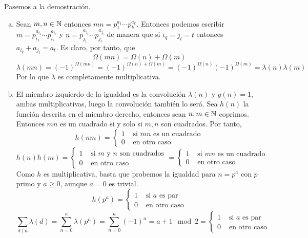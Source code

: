 \documentclass[twoside]{article}
\begin{document}
\begin{solucion}
Pasemos a la demostración.
\begin{enumerate}[(a)]
\item Sean $m,n\in \mathbb{N}$ entonces $mn = p_1^{a_1}\cdots p_k^{a_k}$. Entonces podemos escribir $m=p_{i_1}^{a_{i_1}}\cdots p_{i_s}^{a_{i_s}}$ y $n=p_{j_1}^{a_{j_1}}\cdots p_{j_t}^{a_{j_t}}$ de manera que si $i_q=j_l = t$ entonces $a_{i_q}+a_{j_l}=a_t$. Es claro, por tanto, que 
$$ \Omega(mn) = \Omega(n)+\Omega(m) $$ $$ \lambda(mn) = (-1)^{\Omega(mn)}=(-1)^{ \Omega(n)+\Omega(m)} = (-1)^{\Omega(n)}(-1)^{\Omega(m)} = \lambda(n)\lambda(m)
$$
Por lo que $\lambda$ es completamente multiplicativa.
\item  El miembro izquierdo de la igualdad es la convolución $\lambda(n)$ y $g(n)=1$, ambas multiplicativas, luego la convolución también lo será. Sea $h(n)$ la función descrita en el miembro derecho, entonces sean $n,m\in \mathbb{N}$ coprimos. Entonces $mn$ es un cuadrado si y solo si $m,n$ son cuadrados. Por tanto,
 $$
 h(nm)=\begin{cases}
 		1 &\text{ si }mn\text{ es un cuadrado}\\
 		0 &\text{ en otro caso}
 	\end{cases}
 $$
 $$h(n)h(m)=\begin{cases}
 		1 &\text{ si $m$ y $n$ son cuadrados}\\
 		0 &\text{ en otro caso}
 	\end{cases}
 	=\begin{cases}
 		1 &\text{ si $mn$ es un cuadrado}\\
 		0 &\text{ en otro caso}
	\end{cases}
 $$
 \newpage
 Como $h$ es multiplicativa, basta que probemos la igualdad para $n=p^a$ con $p$ primo y $a\geq 0$, aunque $a=0$ es trivial. 
 $$h(p^a) = \begin{cases}
 		1 &\text{ si $a$ es par}\\
 		0 &\text{ en otro caso}
 	\end{cases}	$$
 	$$
 	\sum_{d\mid n}\lambda(d) = \sum_{n=0}^a \lambda(p^n) = \sum_{n=0}^a (-1)^n = a+1 \mod 2 = \begin{cases}
 		1 &\text{ si $a$ es par}\\
 		0 &\text{ en otro caso}
 	\end{cases}	$$
 	\end{enumerate}

\end{solucion}
\newpage
\end{document}

